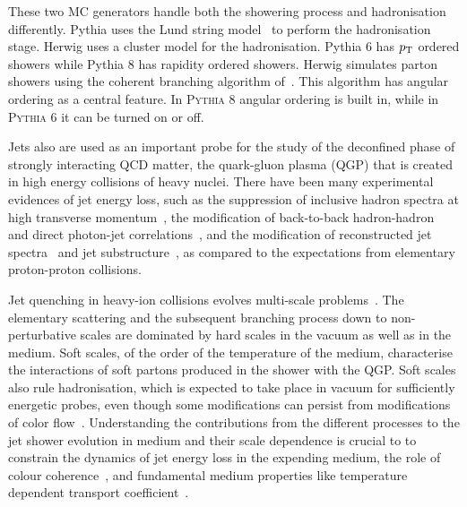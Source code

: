 These two MC generators handle both the showering process and hadronisation differently. Pythia uses the Lund string model~\cite{lundString} to perform the hadronisation stage. Herwig uses a cluster model for the hadronisation. Pythia 6 has $p_{\rm T}$ ordered showers while Pythia 8 has rapidity ordered showers. Herwig simulates parton showers using the coherent branching algorithm of~\cite{Gieseke:2003rz}. This algorithm has angular ordering as a central feature. In \textsc{Pythia} 8 angular ordering is built in, while in \textsc{Pythia} 6 it can be turned on or off.

Jets also are used as an important probe for the study of the deconfined phase of strongly interacting QCD matter, the quark-gluon plasma (QGP) that is created in high energy collisions of heavy nuclei.
There have been many experimental evidences of jet energy loss, such as the suppression of inclusive hadron spectra at high transverse momentum~\cite{Adcox:2001jp,Adams:2003im,Arsene:2003yk,Khachatryan:2016odn,Acharya:2018qsh}, the modification of back-to-back hadron-hadron~\cite{Adare:2007vu,Aamodt:2011vg} and direct photon-jet correlations~\cite{Adare:2012qi}, and the modification of reconstructed jet spectra~\cite{Adam:2015ewa} and jet substructure~\cite{Sirunyan:2018qec,Chatrchyan:2014ava,Acharya:2018uvf}, as compared to the expectations from elementary proton-proton collisions.

Jet quenching in heavy-ion collisions evolves multi-scale problems~\cite{Kurkela:2014tla,Tachibana:2018yae}. The elementary scattering and the subsequent branching process down to non-perturbative scales are dominated by hard scales in the vacuum as well as in the medium. Soft scales, of the order of the temperature of the medium, characterise the interactions of soft partons produced in the shower with the QGP. Soft scales also rule hadronisation, which is expected to take place in vacuum for sufficiently energetic probes, even though some modifications can persist from modifications of color flow~\cite{Aurenche:2011rd,Beraudo:2011bh,Beraudo:2012bq}. Understanding the contributions from the different processes to the jet shower evolution in medium and their scale dependence is crucial to to constrain the dynamics of jet energy loss in the expending medium, the role of colour coherence~\cite{CasalderreySolana:2012ef}, and fundamental medium properties like temperature dependent transport coefficient~\cite{DEramo:2012uzl,Ayala:2016pvm}.

